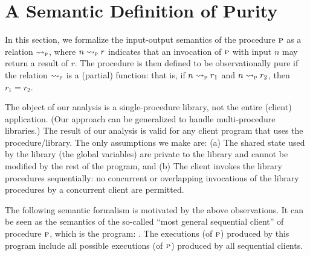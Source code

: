 \section{A Semantic Definition of Purity}
\label{sec:semantics}

In this section, we formalize the input-output semantics of the procedure $\textsc{p}$ as a relation $\rightsquigarrow_{\textsc{p}}$,
where $n \rightsquigarrow_{\textsc{p}} r$ indicates that an invocation of $\textsc{p}$ with input $n$ may return a result of $r$.
The procedure is then defined to be observationally pure if the relation $\rightsquigarrow_{\textsc{p}}$ is a (partial) function:
that is, if  $n \rightsquigarrow_{\textsc{p}} r_1$ and $n \rightsquigarrow_{\textsc{p}} r_2$, then $r_1 = r_2$.

The object of our analysis is a single-procedure library,  not the entire (client) application.
(Our approach can be generalized to handle multi-procedure libraries.)
The result of our analysis is valid for any client program that uses the procedure/library.  The only
assumptions we make are: (a) The shared state used by the library (the
global variables) are private to the library and cannot be modified by the
rest of the program, and (b) The client invokes the library procedures
sequentially: no concurrent or overlapping invocations of the library
procedures by a concurrent client are permitted.

The following semantic formalism is motivated by the above observations. It can be seen as the semantics
of the so-called ``most general sequential client'' of procedure $\textsc{p}$, which is the program:
.
The executions (of $\textsc{p}$) produced by this program include all possible executions (of $\textsc{p}$)  produced by all
sequential clients.


